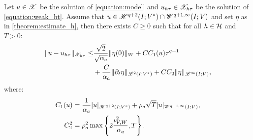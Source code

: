 \begin{theorem} \label{theorem:estimate_ht}
    Let $u \in \mathscr{X}$ be the solution of \cref{equation:model} and $u_{h \tau} \in \mathscr{X}_{h \tau}$ be the solution of \cref{equation:weak_ht}. Assume that $u \in \mathscr{H}^{q + 2}(I; V^*) \cap \mathscr{W}^{q + 1, \infty}(I; V)$ and set $\eta$ as in \cref{theorem:estimate_h}, then there exists $C \geq 0$ such that for all $h \in \mathcal{H}$ and $T > 0$:
    \begin{align}
        \lVert u - u_{h \tau} \rVert_{\mathscr{X}_{h \tau}} \leq & \frac{\sqrt{2}}{\sqrt{\alpha_{a}}} \lVert \eta(0) \rVert_W + C C_1(u) \tau^{q + 1} \\
        & + \frac{C}{\alpha_{a}} \lVert \partial_t \eta \rVert_{\mathscr{L}^{2}(I; V^*)} + C C_2 \lVert \eta \rVert_{\mathscr{L}^{\infty}(I; V)}, \notag
    \end{align}
    where:
    \begin{align}
        C_1(u) & = \frac{1}{\alpha_{a}} \lvert u \rvert_{\mathscr{H}^{q + 2}(I; V^*)} + \rho_{a} \sqrt{T} \lvert u \rvert_{\mathscr{W}^{q + 1, \infty}(I; V)}, \\
        C_2^2 & = \rho_{a}^2 \max \left\{ 2 \frac{\iota_{V, W}^2}{\alpha_{a}}, T \right\}.
    \end{align}
\end{theorem}